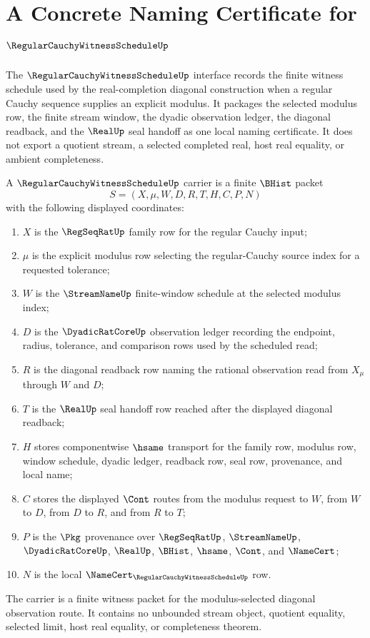 \chapter{A Concrete Naming Certificate for $\RegularCauchyWitnessScheduleUp$}
\label{ch:concrete-instances-regularcauchywitnessschedule-namecert}

The $\RegularCauchyWitnessScheduleUp$ interface records the finite witness schedule used by the real-completion diagonal construction when a regular Cauchy sequence supplies an explicit modulus. It packages the selected modulus row, the finite stream window, the dyadic observation ledger, the diagonal readback, and the $\RealUp$ seal handoff as one local naming certificate. It does not export a quotient stream, a selected completed real, host real equality, or ambient completeness.

\begin{definition}
\label{def:regular-cauchy-witness-schedule-carrier}
A $\RegularCauchyWitnessScheduleUp$ carrier is a finite $\BHist$ packet
$$
S=(X,\mu,W,D,R,T,H,C,P,N)
$$
with the following displayed coordinates:
\begin{enumerate}
\item $X$ is the $\RegSeqRatUp$ family row for the regular Cauchy input;
\item $\mu$ is the explicit modulus row selecting the regular-Cauchy source index for a requested tolerance;
\item $W$ is the $\StreamNameUp$ finite-window schedule at the selected modulus index;
\item $D$ is the $\DyadicRatCoreUp$ observation ledger recording the endpoint, radius, tolerance, and comparison rows used by the scheduled read;
\item $R$ is the diagonal readback row naming the rational observation read from $X_{\mu}$ through $W$ and $D$;
\item $T$ is the $\RealUp$ seal handoff row reached after the displayed diagonal readback;
\item $H$ stores componentwise $\hsame$ transport for the family row, modulus row, window schedule, dyadic ledger, readback row, seal row, provenance, and local name;
\item $C$ stores the displayed $\Cont$ routes from the modulus request to $W$, from $W$ to $D$, from $D$ to $R$, and from $R$ to $T$;
\item $P$ is the $\Pkg$ provenance over $\RegSeqRatUp$, $\StreamNameUp$, $\DyadicRatCoreUp$, $\RealUp$, $\BHist$, $\hsame$, $\Cont$, and $\NameCert$;
\item $N$ is the local $\NameCert_{\RegularCauchyWitnessScheduleUp}$ row.
\end{enumerate}
The carrier is a finite witness packet for the modulus-selected diagonal observation route. It contains no unbounded stream object, quotient equality, selected limit, host real equality, or completeness theorem.
\end{definition}

